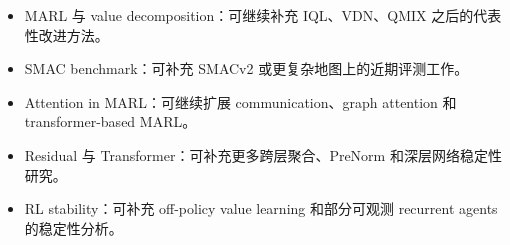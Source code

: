 \begin{itemize}
  \item MARL 与 value decomposition：可继续补充 IQL、VDN、QMIX 之后的代表性改进方法。
  \item SMAC benchmark：可补充 SMACv2 或更复杂地图上的近期评测工作。
  \item Attention in MARL：可继续扩展 communication、graph attention 和 transformer-based MARL。
  \item Residual 与 Transformer：可补充更多跨层聚合、PreNorm 和深层网络稳定性研究。
  \item RL stability：可补充 off-policy value learning 和部分可观测 recurrent agents 的稳定性分析。
\end{itemize}
